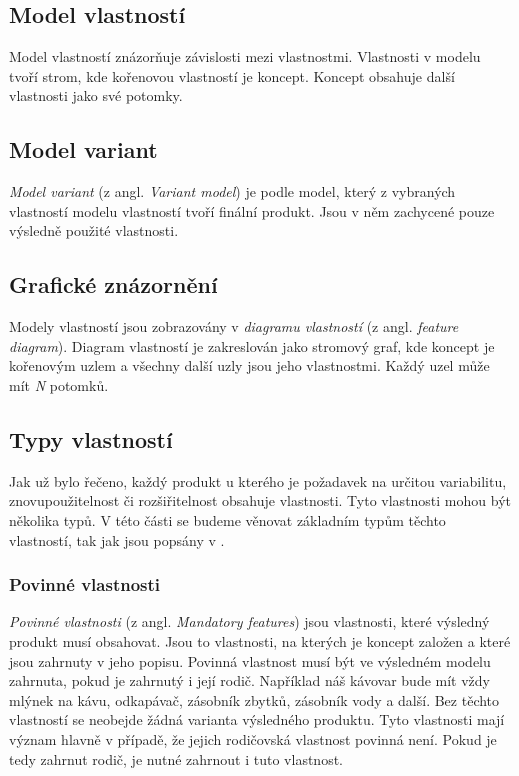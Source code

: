 \subsection{Model vlastností}

Model vlastností znázorňuje závislosti mezi vlastnostmi. Vlastnosti v modelu tvoří strom, kde kořenovou vlastností je koncept. Koncept obsahuje další vlastnosti jako své potomky.

\subsection{Model variant}

\textit{Model variant} (z angl. \textit{Variant model}) je podle \cite{Pure13} model, který z vybraných vlastností modelu vlastností tvoří finální produkt. Jsou v něm zachycené pouze výsledně použité vlastnosti. 

\subsection{Grafické znázornění}
Modely vlastností jsou zobrazovány v \textit{diagramu vlastností} (z angl. \textit{feature diagram}). Diagram vlastností je zakreslován jako stromový graf, kde koncept je kořenovým uzlem a všechny další uzly jsou jeho vlastnostmi. Každý uzel může mít \textit{N} potomků.

\subsection{Typy vlastností}

Jak už bylo řečeno, každý produkt u kterého je požadavek na určitou variabilitu, znovupoužitelnost či rozšiřitelnost obsahuje vlastnosti. Tyto vlastnosti mohou být několika typů. V této části se budeme věnovat základním typům těchto vlastností, tak jak jsou popsány v \cite{Czarnecki98}.

\subsubsection{Povinné vlastnosti}
\textit{Povinné vlastnosti} (z angl. \textit{Mandatory features}) jsou vlastnosti, které výsledný produkt musí obsahovat. Jsou to vlastnosti, na kterých je koncept založen a které jsou zahrnuty v jeho popisu. Povinná vlastnost musí být ve výsledném modelu zahrnuta, pokud je zahrnutý i její rodič. Například náš kávovar bude mít vždy mlýnek na kávu, odkapávač, zásobník zbytků, zásobník vody a další. Bez těchto vlastností se neobejde žádná varianta výsledného produktu. Tyto vlastnosti mají význam hlavně v případě, že jejich rodičovská vlastnost povinná není. Pokud je tedy zahrnut rodič, je nutné zahrnout i tuto vlastnost.

